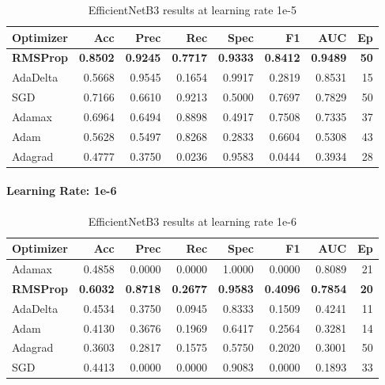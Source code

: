 \begingroup
\tiny
\setlength{\tabcolsep}{2.5pt}
\begin{table}[H]
  \centering
  \caption{EfficientNetB3 results at learning rate 1e-5}
  \label{tab:efficientnetb3-1e5}
  \begin{tabular}{l r r r r r r r}
    \toprule
    \rowcolor{tableheader}
    \textbf{Optimizer} & \textbf{Acc} & \textbf{Prec} & \textbf{Rec} &
    \textbf{Spec} & \textbf{F1} & \textbf{AUC} & \textbf{Ep} \\
    \midrule
    \textbf{RMSProp}  & \textbf{0.8502} & \textbf{0.9245} & \textbf{0.7717} & \textbf{0.9333} & \textbf{0.8412} & \textbf{0.9489} & \textbf{50} \\
    AdaDelta & 0.5668 & 0.9545 & 0.1654 & 0.9917 & 0.2819 & 0.8531 & 15 \\
    SGD      & 0.7166 & 0.6610 & 0.9213 & 0.5000 & 0.7697 & 0.7829 & 50 \\
    Adamax   & 0.6964 & 0.6494 & 0.8898 & 0.4917 & 0.7508 & 0.7335 & 37 \\
    Adam     & 0.5628 & 0.5497 & 0.8268 & 0.2833 & 0.6604 & 0.5308 & 43 \\
    Adagrad  & 0.4777 & 0.3750 & 0.0236 & 0.9583 & 0.0444 & 0.3934 & 28 \\
    \bottomrule
  \end{tabular}
\end{table}
\endgroup

\paragraph{Learning Rate: 1e-6}

\begingroup
\tiny
\setlength{\tabcolsep}{2.5pt}
\begin{table}[H]
  \centering
  \caption{EfficientNetB3 results at learning rate 1e-6}
  \label{tab:efficientnetb3-1e6}
  \begin{tabular}{l r r r r r r r}
    \toprule
    \rowcolor{tableheader}
    \textbf{Optimizer} & \textbf{Acc} & \textbf{Prec} & \textbf{Rec} &
    \textbf{Spec} & \textbf{F1} & \textbf{AUC} & \textbf{Ep} \\
    \midrule
    Adamax   & 0.4858 & 0.0000 & 0.0000 & 1.0000 & 0.0000 & 0.8089 & 21 \\
    \textbf{RMSProp}  & \textbf{0.6032} & \textbf{0.8718} & \textbf{0.2677} & \textbf{0.9583} & \textbf{0.4096} & \textbf{0.7854} & \textbf{20} \\
    AdaDelta & 0.4534 & 0.3750 & 0.0945 & 0.8333 & 0.1509 & 0.4241 & 11 \\
    Adam     & 0.4130 & 0.3676 & 0.1969 & 0.6417 & 0.2564 & 0.3281 & 14 \\
    Adagrad  & 0.3603 & 0.2817 & 0.1575 & 0.5750 & 0.2020 & 0.3001 & 50 \\
    SGD      & 0.4413 & 0.0000 & 0.0000 & 0.9083 & 0.0000 & 0.1893 & 33 \\
    \bottomrule
  \end{tabular}
\end{table}
\endgroup
